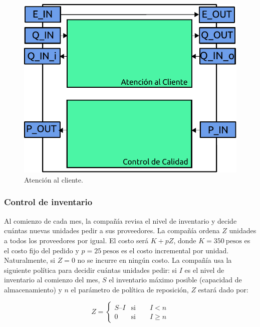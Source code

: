 \documentclass[10pt]{article}
\begin{document}
\begin{figure}[h]
\centering
\includegraphics[scale=0.8]{img/figura5}
\caption{Atención al cliente.}
\label{fig:fig5}
\end{figure}
\FloatBarrier

\subsubsection{Control de inventario\label{sec:CID}}

Al comienzo de cada mes, la compañía revisa el nivel de inventario y decide cuántas nuevas unidades pedir a sus proveedores. La compañía ordena $Z$ unidades a todos los proveedores por igual. El costo será $K + pZ$, donde $K = 350~\textrm{pesos}$ es el costo fijo del pedido y $p = 25~\textrm{pesos}$ es el costo incremental por unidad. Naturalmente, si $Z = 0$ no se incurre en ningún costo. La compañía usa la siguiente política para decidir cuántas unidades pedir: si $I$ es el nivel de inventario al comienzo del mes, $S$ el inventario máximo posible (capacidad de almacenamiento) y $n$ el parámetro de política de reposición, $Z$ estará dado por:

\begin{equation}
Z=\left\{\begin{array}{lr}
		S – I & \textrm{si}\qquad I < n\\
		0 & \textrm{si} \qquad I \geq n
	\end{array}\right.
\label{eq:ctrlinv}
\end{equation}
\end{document}
